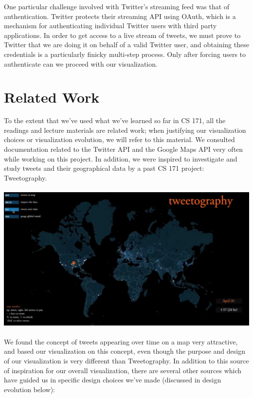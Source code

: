 \documentclass[pdftex,12pt,a4paper]{article}
\begin{document}
One particular challenge involved with Twitter's streaming feed was that of
authentication. Twitter protects their streaming API using OAuth, which is a
mechanism for authenticating individual Twitter users with third party
applications. In order to get access to a live stream of tweets, we must prove
to Twitter that we are doing it on behalf of a valid Twitter user, and obtaining
these credentials is a particularly finicky multi-step process. Only after
forcing users to authenticate can we proceed with our visualization.

\section{Related Work}
To the extent that we've used what we've learned so far in CS 171, all the readings and lecture materials are related work; when justifying our visualization choices or visualization evolution, we will refer to this material. We consulted documentation related to the Twitter API and the Google Maps API very often while working on this project. In addition, we were inspired to investigate and study tweets and their geographical data by a past CS 171 project: Tweetography. \\ \\
\includegraphics[width=5.5in]{tweetography.png} \\ \\
We found the concept of tweets appearing over time on a map very attractive, and based our visualization on this concept, even though the purpose and design of our visualization is very different than Tweetography.
In addition to this source of inspiration for our overall visualization, there are several other sources which have guided us in specific design choices we've made (discussed in design evolution below):
\end{document}
